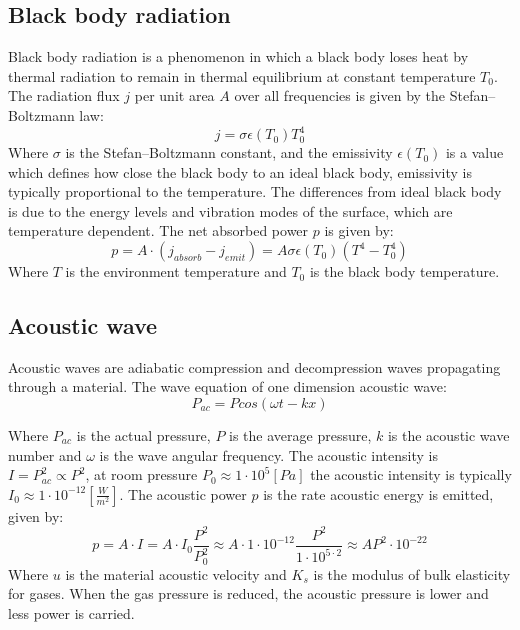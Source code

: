 \documentclass[\main/master.tex]{subfiles}
\begin{document}
\subsection{Black body radiation}
Black body radiation is a phenomenon in which a black body loses heat by thermal radiation to remain in thermal equilibrium at constant temperature $T_0$. The radiation flux $j$ per unit area $A$ over all frequencies is given by the Stefan–Boltzmann law:
\begin{equation}
j = \sigma\epsilon(T_0) T_0^4  \label{eqn: Stefan–Boltzmann law}
\end{equation}
Where $\sigma$ is the Stefan–Boltzmann constant, and the emissivity $\epsilon(T_0)$ is a value which defines how close the black body to an ideal black body, emissivity is typically proportional to the temperature. The differences from ideal black body is due to the energy levels and vibration modes of the surface, which are temperature dependent. The net absorbed power $p$ is given by: 
\begin{equation}
p =A\cdot(j_{absorb}-j_{emit})= A \sigma\epsilon(T_0) (T^4-T_0^4)  \label{eqn: Stefan–Boltzmann power}
\end{equation}
Where $T$ is the environment temperature and $T_0$ is the black body temperature.  
\subsection{Acoustic wave}
Acoustic waves are adiabatic compression and decompression waves propagating through a material. The wave equation of one dimension acoustic wave:
\begin{equation}
P_{ac} = P cos(\omega t -k x)       \label{eqn:acoustic_pressure}
\end{equation}
\par\noindent
Where $P_{ac}$ is the actual pressure, $P$ is the average pressure, $k$ is the acoustic wave number and $\omega$ is the wave angular frequency. The acoustic intensity is $I = P_{ac}^2 \propto P^2$, at room pressure $P_0\approx 1\cdot 10^{5} [Pa]$ the acoustic intensity is typically $I_0\approx 1\cdot 10^{-12}[\frac{W}{m^2}]$. The acoustic power $p$ is the rate acoustic energy is emitted, given by:
\begin{equation}
p = A\cdot I = A\cdot I_0\frac{P^2} {P_0^2} \approx A\cdot 1\cdot 10^{-12}\frac{P^2} {1\cdot 10^{5\cdot 2}}\approx AP^2\cdot 10^{-22} \label{eqn:acoustic power}
\end{equation}
Where $u$ is the material acoustic velocity and $K_s$ is the modulus of bulk elasticity for gases. When the gas pressure is reduced, the acoustic pressure is lower and less power is carried.
\end{document}
